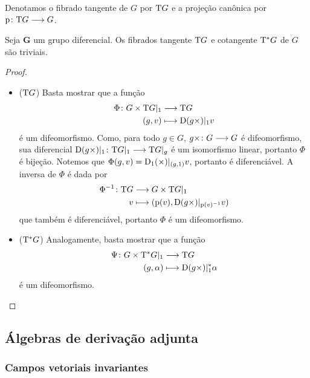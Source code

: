 Denotamos o fibrado tangente de $G$ por $\mathrm{T} G$ e a projeção canônica por ${\mathrm{p}}\colon {\mathrm{T}G} \longrightarrow {G}$.

\begin{proposition}
Seja $\bm G$ um grupo diferencial. Os fibrados tangente $\mathrm{T} G$ e cotangente $\mathrm{T}^* G$ de $G$ são triviais.
\end{proposition}
\begin{proof}
\begin{itemize}
\item ($\mathrm{T} G$) Basta mostrar que a função
	\begin{align*}
	{\Phi}\colon {G \times \mathrm{T}G|_1} &\longrightarrow {\mathrm{T}G} \\{(g,v)} &\longmapsto \mathrm{D}(g \times)|_1 v
	\end{align*}
é um difeomorfismo. Como, para todo $g \in G$, ${g\times}\colon {G} \longrightarrow {G}$ é difeomorfismo, sua diferencial ${\mathrm{D}(g\times)|_1}\colon {\mathrm{T}G|_1} \longrightarrow {\mathrm{T}G|_g}$ é um isomorfismo linear, portanto $\Phi$ é bijeção. Notemos que $\Phi(g,v) = \mathrm{D}_1(\times)|_{(g,1)}v$, portanto é diferenciável. A inversa de $\Phi$ é dada por
	\begin{align*}
		{\Phi^{-1}}\colon {\mathrm{T}G} &\longrightarrow {G \times \mathrm{T}G|_1} \\{v} &\longmapsto (\mathrm{p}(v),\mathrm{D}(g \times)|_{\mathrm{p}(v)^{-1}}v)
	\end{align*}
que também é diferenciável, portanto $\Phi$ é um difeomorfismo.

\item ($\mathrm{T}^* G$) Analogamente, basta mostrar que a função
	\begin{align*}
	{\Psi}\colon {G \times \mathrm{T}^* G|_1} &\longrightarrow {\mathrm{T}G} \\{(g,\alpha)} &\longmapsto \mathrm{D}(g \times)|_1^* \alpha
	\end{align*}
é um difeomorfismo.
\end{itemize}
\end{proof}

\subsection{Álgebras de derivação adjunta}

\subsubsection{Campos vetoriais invariantes}

